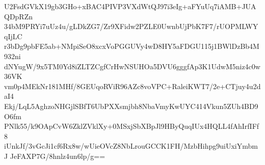 U2FsdGVkX19gb3GHo+xBAC4PIVP3VXdWtQJ97i3eIg+aFYuUq7iAMB+JUAQDpRZn
34bM9PRYi7uUz4u/gLDkZG7/Zr9XFidw2PZLE0UwnbUjPbK7F7/rUOPMLWYqIjLC
r3bDg9pbFE5ab+NMpiSeO8xcxVoPGGUVy4wD8HY5aFDGU115j1BWlDzBb4M932ni
dNYugW/9x5TM0Yd8iZLTZCgfCrHwNSUHOa5DVU6gggfAp3K1UdwM5niz4c0w36VK
vm0p4MEkNr181MHf/8GEUqoRViR96AZc8voVPC+RaleiKWT7/2e+CTjuy4u2daI4
Ekj/LqL5AghzoNHGjlSBfT6UbPXXsmjbh8NbaVmyKwUYC414Vkun5ZUh4BD9O6fm
PNlk55/k9OApCvW6ZklZVklXy+0MSxjSbXBpJl9HByQuqIUx4HQLL4fAhIrfIFf8
iUnkJf/3vGcJi1cf6Rx8w/wUieOVcZ8NbLrouGCCK1FH/MzbHihpg9uiUxiYmbmJ
JeFAXP7G/8hnlz4un6lp/g==
